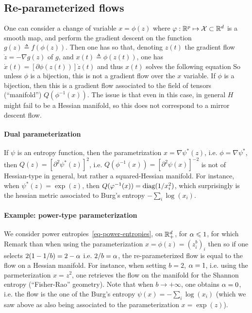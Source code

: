 \subsection{Re-parameterized flows}

One can consider a change of variable $x=\phi(z)$ where $\varphi : \mathbb{R}^p \mapsto \mathcal{X} \subset \mathbb{R}^d$ is a smooth map, and perform the gradient descent on the function $g(z) \triangleq f(\phi(z))$. Then one has
so that, denoting $z(t)$ the gradient flow $\dot z=-\nabla g(z)$ of $g$, and $x(t) \triangleq \phi(z(t))$, one has
$\dot x(t) = [\partial \phi(z(t))] \dot z(t)$ and thus $x(t)$ solves the following equation
So unless $\phi$ is a bijection, this is not a gradient flow over the $x$ variable. If $\phi$ is a bijection, then this is a gradient flow associated to the field of tensors (``manifold'') $Q(\phi^{-1}(x))$. The issue is that even in this case, in general $H$ might fail to be a Hessian manifold, so this does not correspond to a mirror descent flow. 

\paragraph{Dual parameterization} 

If $\psi$ is an entropy function, then the parametrization $x=\nabla\psi^*(z)$, i.e. $\phi=\nabla\psi^*$, then 
$Q(z)=[\partial^2 \psi^*(z)]^2$, i.e. $Q(\phi^{-1}(x)) = [\partial^2 \psi(x)]^{-2}$ is not of Hessian-type in general, but rather a squared-Hessian manifold.
%
For instance, when $\psi^*(z)=\exp(z)$, then $Q(\varphi^{-1}(x)) = \operatorname{diag}(1/x_i^2)$, which surprisingly is the hessian metric associated to Burg's entropy $-\sum_i \log(x_i)$.


\paragraph{Example: power-type parameterization}

We consider power entropies~\eqref{eq-power-entropies}, on $\mathbb{R}_+^d$, for $\alpha \leqslant 1$, for which 
%
Remark than when using the parameterization $x = \phi(z) = (z_i^{b})_i$ then  
so if one selects $2(1-1/b) = 2-\alpha$ i.e. $2/b = \alpha$, the re-parameterized flow is equal to the flow on a Hessian manifold. 
%
For instance, when setting $b=2$, $\alpha=1$, i.e. using the parmeterization $x=z^2$, one retrieves the flow on the manifold for the Shannon entropy (``Fisher-Rao'' geometry). 
%
Note that when $b \rightarrow +\infty$, one obtains $\alpha=0$, i.e. the flow is the one of the Burg's entropy $\psi(x)=-\sum_i \log(x_i)$ (which we saw above as also being associated to the parameterization $x=\exp(z)$).


